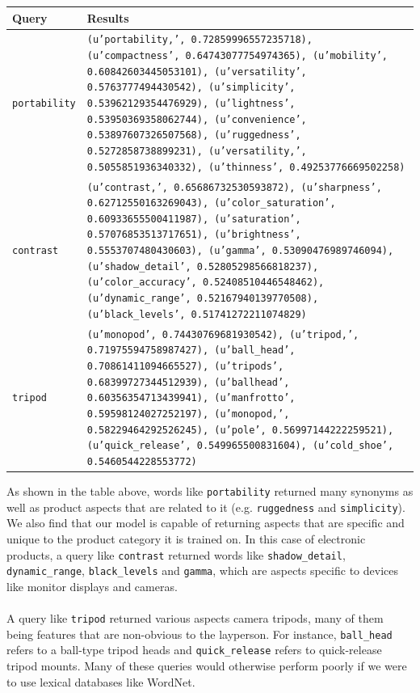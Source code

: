 \documentclass{article} %
\begin{document}
\begin{center}
    \begin{tabular}{ | l | p{9cm} |}
    \hline
    Query & Results \\ \hline
    \texttt{portability} & \texttt{(u'portability,', 0.72859996557235718), (u'compactness', 0.64743077754974365), (u'mobility', 0.60842603445053101), (u'versatility', 0.5763777494430542), (u'simplicity', 0.53962129354476929), (u'lightness', 0.53950369358062744), (u'convenience', 0.53897607326507568), (u'ruggedness', 0.5272858738899231), (u'versatility,', 0.5055851936340332), (u'thinness', 0.49253776669502258)} \\ \hline

	\texttt{contrast} & \texttt{(u'contrast,', 0.65686732530593872), (u'sharpness', 0.62712550163269043), (u'color\_saturation', 0.60933655500411987), (u'saturation', 0.57076853513717651), (u'brightness', 0.5553707480430603), (u'gamma', 0.53090476989746094), (u'shadow\_detail', 0.52805298566818237), (u'color\_accuracy', 0.52408510446548462), (u'dynamic\_range', 0.52167940139770508), (u'black\_levels', 0.51741272211074829)} \\ \hline

	\texttt{tripod} & \texttt{(u'monopod', 0.74430769681930542), (u'tripod,', 0.71975594758987427), (u'ball\_head', 0.70861411094665527), (u'tripods', 0.68399727344512939), (u'ballhead', 0.60356354713439941), (u'manfrotto', 0.59598124027252197), (u'monopod,', 0.58229464292526245), (u'pole', 0.56997144222259521), (u'quick\_release', 0.549965500831604), (u'cold\_shoe', 0.5460544228553772)} \\ \hline
    \end{tabular}
\end{center}

As shown in the table above, words like \texttt{portability} returned many synonyms as well as product aspects that are related to it (e.g. \texttt{ruggedness} and \texttt{simplicity}). We also find that our model is capable of returning aspects that are specific and unique to the product category it is trained on. In this case of electronic products, a query like \texttt{contrast} returned words like \texttt{shadow\_detail}, \texttt{dynamic\_range}, \texttt{black\_levels} and \texttt{gamma}, which are aspects specific to devices like monitor displays and cameras.\\
\\
A query like \texttt{tripod} returned various aspects camera tripods, many of them being features that are non-obvious to the layperson. For instance, \texttt{ball\_head} refers to a ball-type tripod heads and \texttt{quick\_release} refers to quick-release tripod mounts. Many of these queries would otherwise perform poorly if we were to use lexical databases like WordNet.
\end{document}
